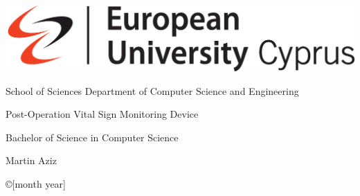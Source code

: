 \thispagestyle{empty}
{

\noindent\includegraphics[scale=0.32]{images/euc.jpg}


\begin{center}
 School of Sciences \textbar \; Department of Computer Science and Engineering
\end{center}

\vspace{1.5cm}
\begin{center}
\Huge  Post-Operation Vital Sign Monitoring Device
\end{center}



\vspace{1.5cm}
\begin{center}\LARGE Bachelor of Science in Computer Science
\end{center}


\vspace{1.5cm}
\begin{center}
\Large Martin Aziz
\end{center}
\vspace{1.5cm}

\noindent
\begin{center}\copyright  [month year]
\end{center}
\newpage
\thispagestyle{empty}

}%
